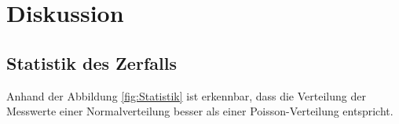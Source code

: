 \section{Diskussion}
\label{sec:Diskussion}


\subsection{Statistik des Zerfalls}
Anhand der Abbildung \ref{fig:Statistik} ist erkennbar, dass die Verteilung der Messwerte einer Normalverteilung besser als einer Poisson-Verteilung entspricht. 
